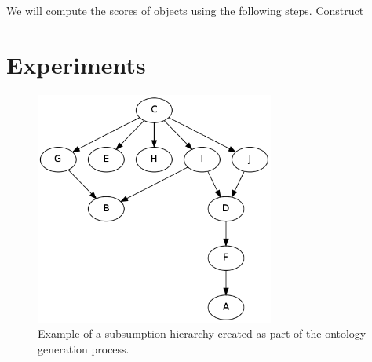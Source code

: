 We will compute the scores of objects using the following steps. Construct



\section{Experiments}

\begin{figure}[t]
\begin{minipage}[b]{0.5\linewidth}
\centering
\includegraphics[width=0.7\textwidth]{media/chapter6/sample-ontology.png}
\caption{Example of a subsumption hierarchy created as part of the ontology generation process.}
\label{fig:sample-ontology}
\end{minipage}
\hspace{0.5cm}
\begin{minipage}[b]{0.45\linewidth}


\end{minipage}
\end{figure}
